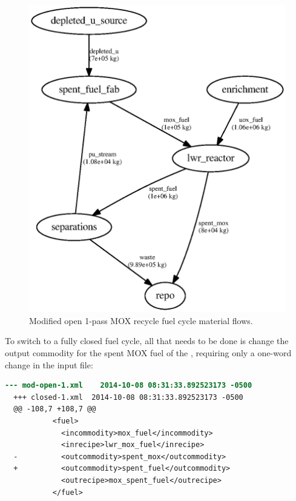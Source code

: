 \begin{figure}[H]
\label{fig:flowmodopen}
\caption{Modified open 1-pass \gls{MOX} recycle fuel cycle material flows.}
\begin{center}
\includegraphics{./images/flow-mod-open-1.eps}
\end{center}
\end{figure}

To switch to a fully closed fuel cycle, all that needs to be done is change
the output commodity for the spent \gls{MOX} fuel of the , 
requiring only a one-word change in the input file: 

\begin{lstlisting}[language=diff]
  --- mod-open-1.xml	2014-10-08 08:31:33.892523173 -0500
  +++ closed-1.xml	2014-10-08 08:31:33.892523173 -0500
  @@ -108,7 +108,7 @@
           <fuel>         
             <incommodity>mox_fuel</incommodity>
             <inrecipe>lwr_mox_fuel</inrecipe>
  -          <outcommodity>spent_mox</outcommodity>
  +          <outcommodity>spent_fuel</outcommodity>
             <outrecipe>mox_spent_fuel</outrecipe>
           </fuel>
\end{lstlisting}

